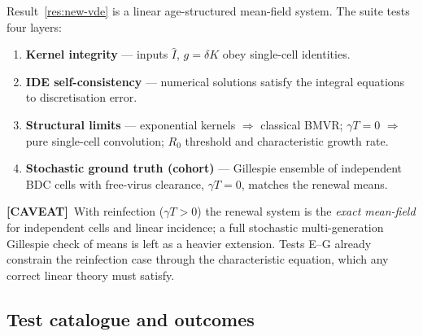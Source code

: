 \documentclass[11pt,a4paper]{article}
\newcommand{\Ihat}{\widehat{I}}
\theoremstyle{plain}
\theoremstyle{definition}
\theoremstyle{remark}
\newcommand{\CAVEAT}{\textcolor{orange!70!black}{\textbf{[CAVEAT]}}}
\begin{document}
Result~\ref{res:new-vde} is a linear age-structured mean-field system. The suite
tests four layers:
\begin{enumerate}
\item \textbf{Kernel integrity} --- inputs $\Ihat$, $g=\delta K$ obey single-cell
  identities.
\item \textbf{IDE self-consistency} --- numerical solutions satisfy the integral
  equations to discretisation error.
\item \textbf{Structural limits} --- exponential kernels $\Rightarrow$ classical
  BMVR; $\gamma T=0$ $\Rightarrow$ pure single-cell convolution; $R_0$ threshold
  and characteristic growth rate.
\item \textbf{Stochastic ground truth (cohort)} --- Gillespie ensemble of
  independent BDC cells with free-virus clearance, $\gamma T=0$, matches the
  renewal means.
\end{enumerate}

\CAVEAT\ With reinfection ($\gamma T>0$) the renewal system is the
\emph{exact mean-field} for independent cells and linear incidence; a full
stochastic multi-generation Gillespie check of means is left as a heavier
extension. Tests E--G already constrain the reinfection case through the
characteristic equation, which any correct linear theory must satisfy.

\subsection{Test catalogue and outcomes}
\end{document}
